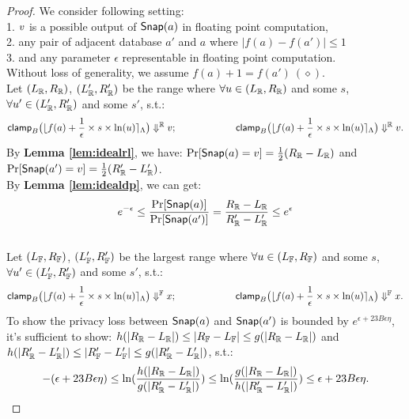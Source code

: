 \documentclass[a4paper,11pt]{article}
\begin{document}
\begin{proof}
%
%
We consider following setting:
\\
1. $v$ is a possible output of $\mathsf{Snap}(a)$ in floating point computation,
%
\\
2. any pair of adjacent database $a'$ and $a$ where $|f(a) - f(a')| \leq 1$
%
\\
3. and any parameter $\epsilon$ representable in floating point computation.
%
\\
Without loss of generality, we assume $f(a) + 1 = f(a') ~ (\diamond)$.
%
\\
%
%
Let $(L_{\mathbb{R}}, R_{\mathbb{R}})$, $(L_{\mathbb{R}}', R_{\mathbb{R}}')$ be the range where 
$\forall u \in (L_{\mathbb{R}}, R_{\mathbb{R}})$ and some $s$, 
$\forall u' \in (L_{\mathbb{R}}', R_{\mathbb{R}}')$ and some $s'$, s.t.:
%
$$\mathsf{clamp}_B \big(
	\lfloor f(a) + \frac{1}{\epsilon} \times s \times \ln (u) \rceil_{\Lambda}
	\big)
	 \Downarrow^{\mathbb{R}} v; 
~~~~~~~~~~~~~~~~~~
\mathsf{clamp}_B \big(
	\lfloor f(a) + \frac{1}{\epsilon} \times s \times \ln (u) \rceil_{\Lambda}
	\big)
	 \Downarrow^{\mathbb{R}} v.$$
%
By \textbf{Lemma \ref{lem:idealrl}}, we have:
$\Pr[\mathsf{Snap}(a) = v] = \frac{1}{2} (R_{\mathbb{R}} - L_{\mathbb{R}})$ 
and $\Pr[\mathsf{Snap}(a') = v] = \frac{1}{2} (R_{\mathbb{R}}' - L_{\mathbb{R}}')$.
%
\\
%
By \textbf{Lemma \ref{lem:idealdp}}, we can get:
\[
	e^{-\epsilon} \leq \frac{\Pr[\mathsf{Snap}(a)]}{\Pr[\mathsf{Snap}(a')]}
	= \frac{R_{\mathbb{R}} - L_{\mathbb{R}}}{R_{\mathbb{R}}' - L_{\mathbb{R}}'} \leq e^{\epsilon}
\]
%
\\
%
Let $(L_{\mathbb{F}}, R_{\mathbb{F}})$, $(L_{\mathbb{F}}', R_{\mathbb{F}}')$ be the largest range where 
$\forall u \in (L_{\mathbb{F}}, R_{\mathbb{F}})$ and some $s$, 
$\forall u' \in (L_{\mathbb{F}}', R_{\mathbb{F}}')$ and some $s'$, s.t.:
%
$$
\mathsf{clamp}_B \big(
	\lfloor f(a) + \frac{1}{\epsilon} \times s \times \ln (u) \rceil_{\Lambda}
	\big)
	\Downarrow^{\mathbb{F}} x; 
~~~~~~~~~~~~~~~~~~
\mathsf{clamp}_B \big(
	\lfloor f(a) + \frac{1}{\epsilon} \times s \times \ln (u) \rceil_{\Lambda}
	\big)
	\Downarrow^{\mathbb{F}} x.$$
%
To show the privacy loss between $\mathsf{Snap}(a)$ and $\mathsf{Snap}(a')$ is bounded by $e^{\epsilon + 23 B \epsilon \eta}$, it’s sufficient to show:
%
%
$h(|{R_{\mathbb{R}}} - {L_{\mathbb{R}}}|) \leq |R_{\mathbb{F}} - L_{\mathbb{F}}| \leq g(|{R_{\mathbb{R}}} - {L_{\mathbb{R}}}|)$ and 
$h(|{R_{\mathbb{R}}'} - {L_{\mathbb{R}}'}|) \leq |R_{\mathbb{F}}' - L_{\mathbb{F}}'|
\leq g(|{R_{\mathbb{R}}'} - {L_{\mathbb{R}}'}|) $,
%
s.t.:
%
\[
	-(\epsilon + 23 B \epsilon \eta)
	\leq \ln( \frac{h(|{R_{\mathbb{R}}} - {L_{\mathbb{R}}}|)}{g(|{R_{\mathbb{R}}'} - {L_{\mathbb{R}}'}|)} ) 
	\leq
	\ln( \frac{g(|{R_{\mathbb{R}}} - {L_{\mathbb{R}}}|)}{h(|{R_{\mathbb{R}}'} - {L_{\mathbb{R}}'}|)} )
	\leq \epsilon + 23 B \epsilon \eta.
\]


\end{proof}
\end{document}
